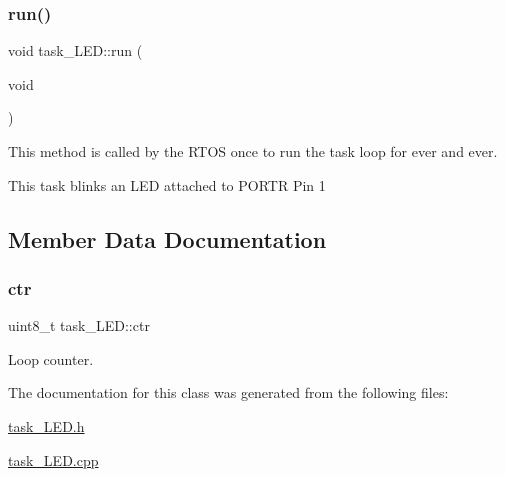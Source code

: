 \subsubsection{\texorpdfstring{run()}{run()}}
{\footnotesize\ttfamily void task\+\_\+\+L\+E\+D\+::run (\begin{DoxyParamCaption}\item[{void}]{ }\end{DoxyParamCaption})}

This method is called by the R\+T\+OS once to run the task loop for ever and ever.

This task blinks an L\+ED attached to P\+O\+R\+TR Pin 1 

\subsection{Member Data Documentation}
\mbox{\label{classtask__LED_ad70fcfd73a9a1bd053c1126fa61b24a7}} 
\subsubsection{\texorpdfstring{ctr}{ctr}}
{\footnotesize\ttfamily uint8\+\_\+t task\+\_\+\+L\+E\+D\+::ctr\hspace{0.3cm}{\ttfamily [protected]}}



Loop counter. 



The documentation for this class was generated from the following files\+:\begin{DoxyCompactItemize}
\item 
\mbox{\hyperlink{task__LED_8h}{task\+\_\+\+L\+E\+D.\+h}}\item 
\mbox{\hyperlink{task__LED_8cpp}{task\+\_\+\+L\+E\+D.\+cpp}}\end{DoxyCompactItemize}
